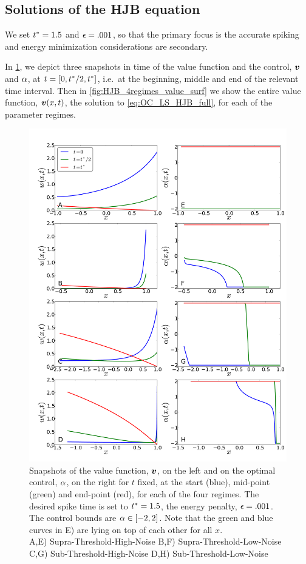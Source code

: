\documentclass{article}
\begin{document}
\subsection{Solutions of the HJB equation}
We set ${ t^* }=1.5$ and ${\epsilon} = .001$, so that the primary focus is the accurate
spiking and energy minimization considerations are secondary. 

In \cref{fig:HJB_4regimes_value_control_cuts}, we depict three snapshots
in time of the value function and the control, ${ \boldsymbol{v} }$ and ${\alpha}$, at $t = [0,{ t^* }/2,
{ t^* }]$, i.e.\ at the beginning, middle and end of the relevant time interval. Then in
\cref{fig:HJB_4regimes_value_surf} we show the entire value function, ${ \boldsymbol{v} }(x,t)$,
the solution to \cref{eq:OC_LS_HJB_full}, for each of the parameter regimes.
\begin{figure}[htp]
\begin{center}
  \includegraphics[width=.99\textwidth]{Figs/HJB/Regimes_vc_cuts.pdf}
  \caption[labelInTOC]{Snapshots of the value function, ${ \boldsymbol{v} }$, on the left and on
  the optimal control, ${\alpha}$, on the right for $t$ fixed, at the start (blue),
  mid-point (green) and end-point (red), for each of the four regimes. The desired spike time is set to ${ t^* }=1.5$, the energy penalty, ${\epsilon}
  = .001$. The control bounds are ${\alpha} \in [-2,2]$. Note that the green and blue
  curves in E) are lying on top of each other for all $x$.
  \\
  A,E) Supra-Threshold-High-Noise B,F) Supra-Threshold-Low-Noise 
  C,G) Sub-Threshold-High-Noise D,H) Sub-Threshold-Low-Noise
  }   
\label{fig:HJB_4regimes_value_control_cuts}
\end{center}
\end{figure}  
\end{document}
